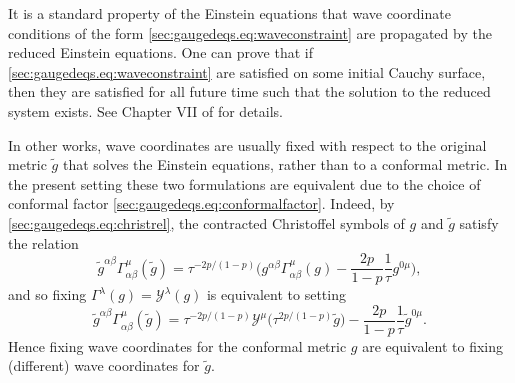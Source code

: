\documentclass{article}
\newcommand{\mc}{\mathcal}
\newcommand{\wt}{\widetilde}
\begin{document}
\begin{remark}
It is a standard property of the Einstein equations that wave coordinate conditions of the form \eqref{sec:gaugedeqs.eq:waveconstraint} are propagated by the reduced Einstein equations. One can prove that if \eqref{sec:gaugedeqs.eq:waveconstraint} are satisfied on some initial Cauchy surface, then they are satisfied for all future time such that the solution to the reduced system exists. See Chapter VII of \cite{Cho:grbook:15} for details.

In other works, wave coordinates are usually fixed with respect to the original metric $\wt{g}$ that solves the Einstein equations, rather than to a conformal metric. In the present setting these two formulations are equivalent due to the choice of conformal factor \eqref{sec:gaugedeqs.eq:conformalfactor}. Indeed, by \eqref{sec:gaugedeqs.eq:christrel}, the contracted Christoffel symbols of $g$ and $\wt{g}$ satisfy the relation 
    \begin{equation}
        \wt{g}^{\alpha\beta}\Gamma_{\alpha\beta}^\mu(\wt{g}) = \tau^{-2p/(1-p)}\Big(g^{\alpha\beta}\Gamma_{\alpha\beta}^\mu(g)-\frac{2p}{1-p}\frac{1}{\tau}g^{0\mu}\Big),
    \end{equation}
    and so fixing $\Gamma^\lambda(g) = \mc{Y}^\lambda(g)$ is equivalent to setting
    \begin{equation}
        \wt{g}^{\alpha\beta}\Gamma_{\alpha\beta}^\mu(\wt{g}) = \tau^{-2p/(1-p)}\mc{Y}^\mu\big(\tau^{2p/(1-p)}\wt{g}\big) - \frac{2p}{1-p}\frac{1}{\tau}\wt{g}^{0\mu}.
    \end{equation}
    Hence fixing wave coordinates for the conformal metric $g$ are equivalent to fixing (different) wave coordinates for $\wt{g}$.
\end{remark}
\end{document}
